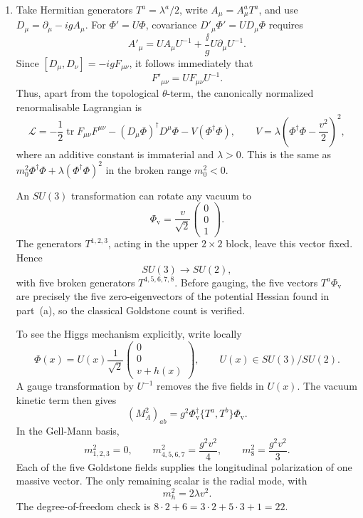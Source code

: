 \begin{enumerate}
\begin{enumerate}
    \item[(b)]
    Take Hermitian generators \(T^a=\lambda^a/2\), write
    \(A_\mu=A_\mu^aT^a\), and use
    \(D_\mu=\partial_\mu-igA_\mu\).  For
    \(\Phi'=U\Phi\), covariance \(D'_\mu\Phi'=UD_\mu\Phi\) requires
    \[
      \boxed{A'_\mu
        =UA_\mu U^{-1}+\frac{\ii}{g}U\partial_\mu U^{-1}.}
    \]
    Since
    \([D_\mu,D_\nu]=-igF_{\mu\nu}\), it follows immediately that
    \[
      F'_{\mu\nu}=UF_{\mu\nu}U^{-1}.
    \]
    Thus, apart from the topological \(\theta\)-term, the canonically
    normalized renormalisable Lagrangian is
    \[
      \mathcal L=-\frac12\operatorname{tr}F_{\mu\nu}F^{\mu\nu}
        -(D_\mu\Phi)^\dagger D^\mu\Phi
        -V(\Phi^\dagger\Phi),
      \qquad
      V=\lambda\left(\Phi^\dagger\Phi-\frac{v^2}{2}\right)^2 ,
    \]
    where an additive constant is immaterial and
    \(\lambda>0\).  This is the same as
    \(m_0^2\Phi^\dagger\Phi+\lambda(\Phi^\dagger\Phi)^2\) in the broken
    range \(m_0^2<0\).

    An \(SU(3)\) transformation can rotate any vacuum to
    \[
      \Phi_{\mathrm v}=\frac{v}{\sqrt2}
        \begin{pmatrix}0\\0\\1\end{pmatrix}.
    \]
    The generators \(T^{1,2,3}\), acting in the upper \(2\times2\)
    block, leave this vector fixed.  Hence
    \[
      \boxed{SU(3)\longrightarrow SU(2),}
    \]
    with five broken generators \(T^{4,5,6,7,8}\).  Before gauging, the
    five vectors \(T^a\Phi_{\mathrm v}\) are precisely the five
    zero-eigenvectors of the potential Hessian found in part~(a), so the
    classical Goldstone count is verified.

    To see the Higgs mechanism explicitly, write locally
    \[
      \Phi(x)=U(x)\frac1{\sqrt2}
        \begin{pmatrix}0\\0\\v+h(x)\end{pmatrix},
      \qquad U(x)\in SU(3)/SU(2).
    \]
    A gauge transformation by \(U^{-1}\) removes the five fields in
    \(U(x)\).  The vacuum kinetic term then gives
    \[
      (M_A^2)_{ab}
        =g^2\Phi_{\mathrm v}^\dagger
          \{T^a,T^b\}\Phi_{\mathrm v}.
    \]
    In the Gell-Mann basis,
    \[
      m_{1,2,3}^2=0,\qquad
      m_{4,5,6,7}^2=\frac{g^2v^2}{4},\qquad
      m_8^2=\frac{g^2v^2}{3}.
    \]
    Each of the five Goldstone fields supplies the longitudinal
    polarization of one massive vector.  The only remaining scalar is
    the radial mode, with
    \[
      \boxed{m_h^2=2\lambda v^2.}
    \]
    The degree-of-freedom check is
    \(8\cdot2+6=3\cdot2+5\cdot3+1=22\).
  \end{enumerate}


\end{enumerate}
